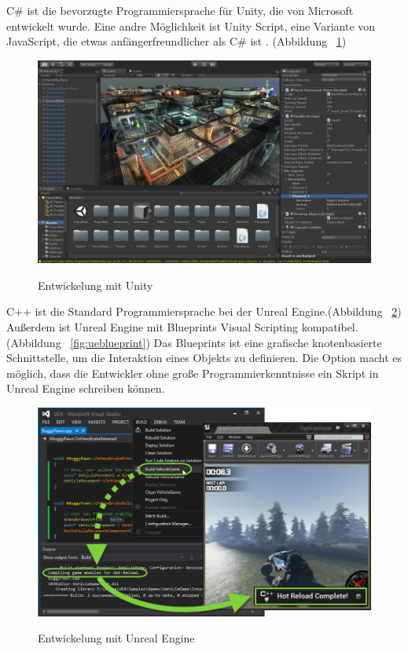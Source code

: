   C\# ist die bevorzugte Programmiersprache für Unity, die von Microsoft entwickelt wurde. Eine andre Möglichkeit ist Unity Script, eine Variante von JavaScript, die etwas anfängerfreundlicher als C\# ist . (Abbildung ~\ref{fig:unity})
  
\begin{figure}[ht]
\vspace*{1em}
\centering
\caption{Entwickelung mit Unity}
\includegraphics[width=\textwidth]{images/unity.jpg}
\label{fig:unity} 
\end{figure}
  
  C++ ist die Standard Programmiersprache bei der Unreal Engine.(Abbildung ~\ref{fig:uec}) Außerdem ist Unreal Engine mit Blueprints Visual Scripting kompatibel.(Abbildung ~\ref{fig:ueblueprint}) Das Blueprints ist eine grafische knotenbasierte Schnittstelle, um die Interaktion eines Objekts zu definieren. Die Option macht es möglich, dass die Entwickler ohne große Programmierkenntnisse ein Skript in Unreal Engine schreiben können.

\begin{figure}[ht]
\vspace*{1em}
\centering
\caption{Entwickelung mit Unreal Engine}
\includegraphics[width=\textwidth]{images/uec.png}
\label{fig:uec} 
\end{figure} 
  
